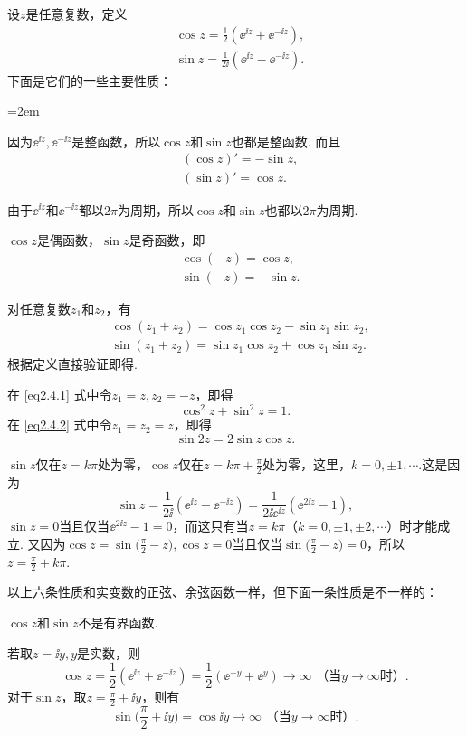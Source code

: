 设$z$是任意复数，定义
\begin{align*}
  & \cos z = \frac12(\ee^{\ii z} + \ee^{-\ii z}),\\
  & \sin z = \frac1{2\ii}(\ee^{\ii z} - \ee^{-\ii z}).
\end{align*}
下面是它们的一些主要性质：
\begin{eenum}\parindent=2em
  \item 因为$\ee^{\ii z},\ee^{-\ii z}$是整函数，所以$\cos z$和$\sin z$也都是整函数.
    而且
    \begin{align*}
      & (\cos z)' = -\sin z,\\
      & (\sin z)' = \cos z.
    \end{align*}
  \item 由于$\ee^{\ii z}$和$\ee^{-\ii z}$都以$2\pi$为周期，所以$\cos z$和$\sin z$也都以$2\pi$为周期.
  \item $\cos z$是偶函数，$\sin z$是奇函数，即
    \begin{align*}
      & \cos(-z) = \cos z,\\
      & \sin(-z) = -\sin z.
    \end{align*}
  \item 对任意复数$z_1$和$z_2$，有
    \begin{align}
      & \cos(z_1 + z_2) = \cos z_1\cos z_2 - \sin z_1\sin z_2,\label{eq2.4.1}\\
      & \sin(z_1 + z_2) = \sin z_1\cos z_2 + \cos z_1\sin z_2.\label{eq2.4.2}
    \end{align}
    根据定义直接验证即得.
  \item 在 \eqref{eq2.4.1} 式中令$z_1=z,z_2=-z$，即得
    \[
      \cos^2 z + \sin ^2z = 1.
    \]
    在 \eqref{eq2.4.2} 式中令$z_1=z_2=z$，即得
    \[
      \sin2z = 2\sin z \cos z.
    \]
  \item $\sin z$仅在$z=k\pi$处为零，$\cos z$仅在$z=k\pi+\frac\pi2$处为零，这里，$k=0,\pm1,\cdots$.这是因为
    \[
    \sin z = \frac1{2\ii}(\ee^{\ii z} - \ee^{-\ii z}) = \frac1{2\ii\ee^{\ii z}}(\ee^{2\ii z}-1),
    \]
    $\sin z=0$当且仅当$\ee^{2\ii z}-1=0$，而这只有当$z=k\pi$（$k=0,\pm1,\pm2,\cdots$）时才能成立. 又因为$\cos z=\sin\bigg(\frac\pi2-z\bigg),\cos z=0$当且仅当$\sin\bigg(\frac\pi2-z\bigg)=0$，所以$z=\frac\pi2+k\pi$.

    以上六条性质和实变数的正弦、余弦函数一样，但下面一条性质是不一样的：
  \item $\cos z$和$\sin z$不是有界函数.

    若取$z=\ii y,y$是实数，则
    \[
      \cos z = \frac12(\ee^{\ii z} + \ee^{-\ii z}) = \frac12(\ee^{-y}+\ee^y) \to \infty \mbox{ （当$y\to\infty$时）}.
    \]
    对于$\sin z$，取$z=\frac\pi2+\ii y$，则有
    \[
      \sin\bigg( \frac\pi2 + \ii y \bigg) = \cos \ii y \to \infty\mbox{ （当$y\to\infty$时）}.
    \]
\end{eenum}

